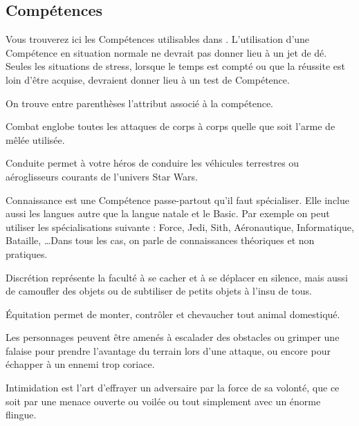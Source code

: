 \subsection{Compétences}
Vous trouverez ici les Compétences utilisables dans \swr. L’utilisation d’une Compétence en situation normale ne devrait pas donner lieu à un jet de dé. Seules les situations de stress, lorsque le temps est compté ou que la réussite est loin d’être acquise, devraient donner lieu à un test de Compétence.

On trouve entre parenthèses l’attribut associé à la compétence.

\begin{description}[align=left]
    \item [Combat (Agi)]
        Combat englobe toutes les attaques de corps à corps quelle que soit l’arme de mêlée utilisée.

    \item [Conduite (Agi)]
        Conduite permet à votre héros de conduire les véhicules terrestres ou aéroglisseurs courants de l’univers Star Wars.

    \item [Connaissance (Int)]
        Connaissance est une Compétence passe-partout qu’il faut spécialiser. Elle inclue aussi les langues autre que la langue natale et le Basic. Par exemple on peut utiliser les spécialisations suivante : Force, Jedi, Sith, Aéronautique, Informatique, Bataille, \ldots Dans tous les cas, on parle de connaissances théoriques et non pratiques.

    \item [Discrétion (Agi)]
        Discrétion représente la faculté à se cacher et à se déplacer en silence, mais aussi de camoufler des objets ou de subtiliser de petits objets à l’insu de tous.

    \item [\'Equitation (Agi)]
        \'Equitation permet de monter, contrôler et chevaucher tout animal domestiqué.

    \item [Escalade (For)]
        Les personnages peuvent être amenés à escalader des obstacles ou grimper une falaise pour prendre l’avantage du terrain lors d’une attaque, ou encore pour échapper à un ennemi trop coriace.

    \item [Intimidation (\^Ame)]
        Intimidation est l’art d’effrayer un adversaire par la force de sa volonté, que ce soit par une menace ouverte ou voilée ou tout simplement avec un énorme flingue.


\end{description}
